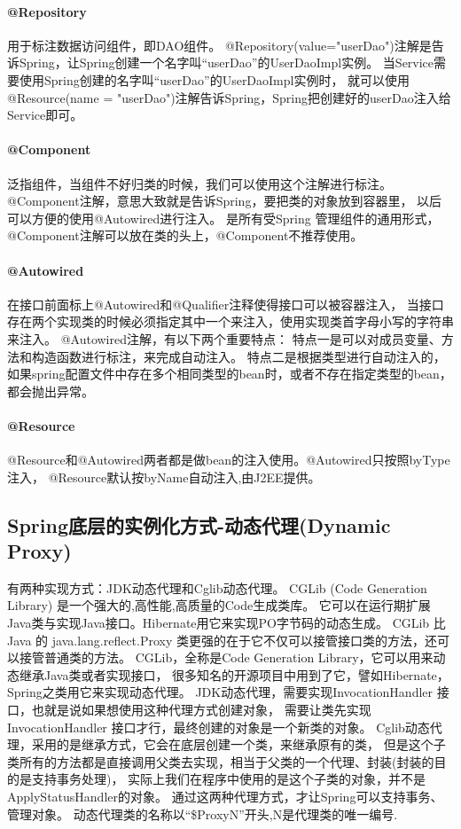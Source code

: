 \documentclass{book}
\begin{document}
\paragraph{@Repository}用于标注数据访问组件，即DAO组件。
@Repository(value="userDao")注解是告诉Spring，让Spring创建一个名字叫“userDao”的UserDaoImpl实例。
当Service需要使用Spring创建的名字叫“userDao”的UserDaoImpl实例时，
就可以使用@Resource(name = "userDao")注解告诉Spring，Spring把创建好的userDao注入给Service即可。

\paragraph{@Component}泛指组件，当组件不好归类的时候，我们可以使用这个注解进行标注。
@Component注解，意思大致就是告诉Spring，要把类的对象放到容器里，
以后可以方便的使用@Autowired进行注入。
是所有受Spring 管理组件的通用形式，@Component注解可以放在类的头上，@Component不推荐使用。

\paragraph{@Autowired}在接口前面标上@Autowired和@Qualifier注释使得接口可以被容器注入，
当接口存在两个实现类的时候必须指定其中一个来注入，使用实现类首字母小写的字符串来注入。
@Autowired注解，有以下两个重要特点：
特点一是可以对成员变量、方法和构造函数进行标注，来完成自动注入。
特点二是根据类型进行自动注入的，如果spring配置文件中存在多个相同类型的bean时，或者不存在指定类型的bean，都会抛出异常。

\paragraph{@Resource}@Resource和@Autowired两者都是做bean的注入使用。@Autowired只按照byType注入，
@Resource默认按byName自动注入,由J2EE提供。

\subsection{Spring底层的实例化方式-动态代理(Dynamic Proxy)}

有两种实现方式：JDK动态代理和Cglib动态代理。
CGLib (Code Generation Library) 是一个强大的,高性能,高质量的Code生成类库。
它可以在运行期扩展Java类与实现Java接口。Hibernate用它来实现PO字节码的动态生成。
CGLib 比 Java 的 java.lang.reflect.Proxy 类更强的在于它不仅可以接管接口类的方法，还可以接管普通类的方法。
CGLib，全称是Code Generation Library，它可以用来动态继承Java类或者实现接口，
很多知名的开源项目中用到了它，譬如Hibernate，Spring之类用它来实现动态代理。
JDK动态代理，需要实现InvocationHandler 接口，也就是说如果想使用这种代理方式创建对象，
需要让类先实现InvocationHandler 接口才行，最终创建的对象是一个新类的对象。
Cglib动态代理，采用的是继承方式，它会在底层创建一个类，来继承原有的类，
但是这个子类所有的方法都是直接调用父类去实现，相当于父类的一个代理、封装(封装的目的是支持事务处理)，
实际上我们在程序中使用的是这个子类的对象，并不是ApplyStatusHandler的对象。
通过这两种代理方式，才让Spring可以支持事务、管理对象。
动态代理类的名称以“\$ProxyN”开头,N是代理类的唯一编号.
\end{document}
